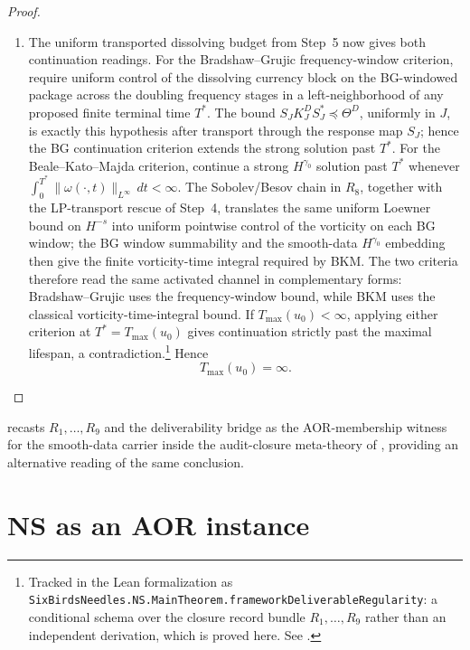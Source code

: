 \documentclass[11pt]{article}
\newcommand{\preceqq}{\preceq}
\newcommand{\Tmax}{T_{\max}}
\theoremstyle{definition}
\begin{document}
\begin{proof}
\begin{enumerate}[label=\emph{Step \arabic*.}]
than stage-dependent.  This uniform transported dissolving budget is
the activated continuation channel consumed by the Bradshaw--Grujic and
Beale--Kato--Majda continuation criteria in Step~6.
\item The uniform transported dissolving budget from Step~5 now gives
both continuation readings.  For the Bradshaw--Grujic frequency-window
criterion, \citet{BradshawGrujic2017} require uniform control of the
dissolving currency block on the BG-windowed package across the
doubling frequency stages in a left-neighborhood of any proposed finite
terminal time \(T^*\).  The bound
\(S_JK^D_JS_J^*\preceqq\Theta^D\), uniformly in \(J\), is exactly this
hypothesis after transport through the response map \(S_J\); hence the
BG continuation criterion extends the strong solution past \(T^*\).
For the Beale--Kato--Majda criterion, \citet{BealeKatoMajda1984}
continue a strong \(H^{\gamma_0}\) solution past \(T^*\) whenever
\(\int_0^{T^*}\|\omega(\cdot,t)\|_{L^\infty}\,dt<\infty\).  The
Sobolev/Besov chain in \(R_8\), together with the LP-transport rescue
of Step~4, translates the same uniform Loewner bound on \(H^{-s}\) into
uniform pointwise control of the vorticity on each BG window; the BG
window summability and the smooth-data \(H^{\gamma_0}\) embedding then
give the finite vorticity-time integral required by BKM.  The two
criteria therefore read the same activated channel in complementary
forms: Bradshaw--Grujic uses the frequency-window bound, while BKM uses
the classical vorticity-time-integral bound.  If
\(\Tmax(u_0)<\infty\), applying either criterion at
\(T^*=\Tmax(u_0)\) gives continuation strictly past the maximal
lifespan, a contradiction.\footnote{Tracked in the Lean formalization as
\texttt{SixBirdsNeedles.NS.MainTheorem.frameworkDeliverableRegularity}:
a conditional schema over the closure record bundle
\(R_1,\ldots,R_9\) rather than an independent derivation,
which is proved here.  See
.}  Hence
\[
  \Tmax(u_0)=\infty .
\]
\end{enumerate}
\end{proof}

 recasts \(R_1,\ldots,R_9\) and the
deliverability bridge as the AOR-membership witness for the
smooth-data carrier inside the audit-closure meta-theory of
\citet{Tsiokos2026AOR}, providing an alternative reading of the same
conclusion.

 

\section{NS as an AOR instance}
\label{sec:ns-aor-instance}
\end{document}
